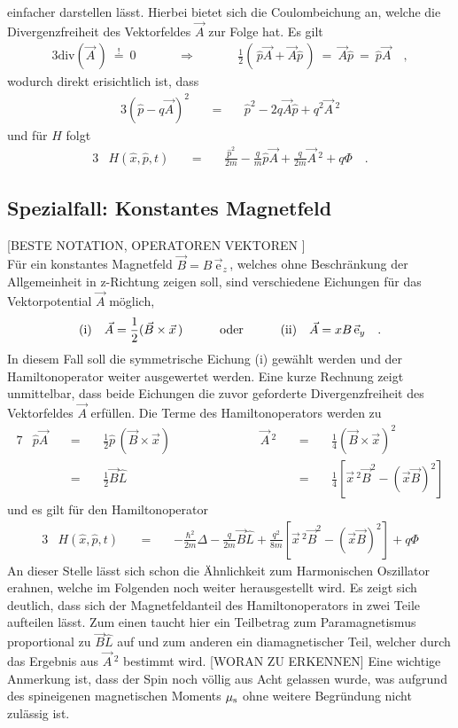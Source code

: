 \documentclass[a4paper,11pt, twoside]{article}
\newcommand{\+}{\dagger}
\renewcommand{\it}{\mathit}
\renewcommand{\v}{\vec}
\renewcommand{\^}{\hat}
\renewcommand{\tt}{\text}
\renewcommand{\~}{\widetilde}
\begin{document}
einfacher darstellen lässt. Hierbei bietet sich die Coulombeichung an, welche die Divergenzfreiheit des Vektorfeldes $\v A$ zur Folge hat. Es gilt
\begin{alignat*}{3}
\tt{div}(\v A\,) \ \stackrel{!}{=} \ 0 &&\qquad \Rightarrow \qquad && \frac{1}{2}(\,\^p\v A + \v A\^p\,)\ =\  \v A\^p \ =\ \^p \v A \quad ,
\end{alignat*}
wodurch direkt erisichtlich ist, dass  
\begin{alignat*}{3}
(\^p -q \v A)^2 && \ =\ && \^p ^2 -2q \v A \^ p +q^2\v A \,^2 
\end{alignat*}
und für $H$ folgt
\begin{alignat*}{3}
& H(\^ x,\^ p,t)&& \ =\  && \frac{\^ p ^2}{2m} - \frac{q}{m}\^ p\v A +\frac{q}{2m}\v A\,^2+q\Phi  \quad .
\end{alignat*}


\subsection{Spezialfall: Konstantes Magnetfeld}
[BESTE NOTATION, OPERATOREN VEKTOREN ]\\
Für ein konstantes Magnetfeld $\v{B} = B\,\v{\tt{e}}_z\,$, welches ohne Beschränkung der Allgemeinheit in z-Richtung zeigen soll, sind verschiedene Eichungen für das Vektorpotential $\v A$ möglich, 
\begin{alignat*}{3}
(\tt{i})\quad \v A = \frac{1}{2}(\v B \times \v x \,) && \qquad \tt{oder} \qquad &&(\tt{ii})\quad \v A = xB\,\v{\tt e}_y \quad .
\end{alignat*}
In diesem Fall soll die symmetrische Eichung (i) gewählt werden und der Hamiltonoperator weiter ausgewertet werden. Eine kurze Rechnung zeigt unmittelbar, dass beide Eichungen die zuvor geforderte Divergenzfreiheit des Vektorfeldes $\v A$ erfüllen. Die Terme des Hamiltonoperators werden zu
\begin{alignat*}{7}
& \^p\v A && \ = \ && \frac{1}{2}\^p\,(\v B \times \v x)  && \qquad\qquad && \v A \,^2 &&\ =\ && \frac{1}{4}(\v B \times \v x)^2\\[2pt]
& && \ = \ && \frac{1}{2}\v B \^L 										&& \qquad\qquad && 		&&\ =\ && \frac{1}{4}\left [\v x\,^2 \v B^2 - (\v x \v B)^2 \right ]
\end{alignat*}
und es gilt für den Hamiltonoperator
\begin{alignat*}{3}
& H(\^ x,\^ p,t)&& \ =\  && -\frac{\hbar^2}{2m}\Delta - \frac{q}{2m}\v B \^L  +\frac{q^2}{8m}\left [\v x\,^2 \v B^2 - (\v x \v B)^2 \right ] +q\it\Phi
\end{alignat*}
An dieser Stelle lässt sich schon die Ähnlichkeit zum Harmonischen Oszillator erahnen, welche im Folgenden noch weiter herausgestellt wird. Es zeigt sich deutlich, dass sich der Magnetfeldanteil des Hamiltonoperators in zwei Teile aufteilen lässt. Zum einen taucht hier ein Teilbetrag zum Paramagnetismus proportional zu $\v B \^ L$ auf und zum anderen ein diamagnetischer Teil, welcher durch das Ergebnis aus $\v A \,^2$ bestimmt wird. [WORAN ZU ERKENNEN] 
Eine wichtige Anmerkung ist, dass der Spin noch völlig aus Acht gelassen wurde, was aufgrund des spineigenen magnetischen Moments $\mu_\tt s$ ohne weitere Begründung nicht zulässig ist. 
\end{document}
